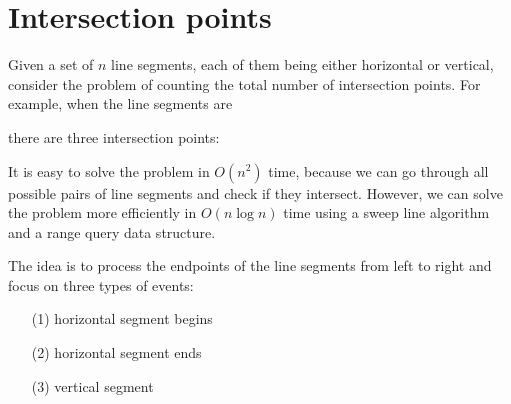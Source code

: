 \section{Intersection points}


Given a set of $n$ line segments, each of them being either
horizontal or vertical, consider the problem of
counting the total number of intersection points.
For example, when the line segments are
\begin{center}
\end{center}
there are three intersection points:
\begin{center}
\end{center}

It is easy to solve the problem in $O(n^2)$ time,
because we can go through all possible pairs of line segments
and check if they intersect.
However, we can solve the problem more efficiently
in $O(n \log n)$ time using a sweep line algorithm
and a range query data structure.

The idea is to process the endpoints of the line
segments from left to right and
focus on three types of events:
\begin{enumerate}[noitemsep]
    \item[(1)] horizontal segment begins
    \item[(2)] horizontal segment ends
    \item[(3)] vertical segment
\end{enumerate}

